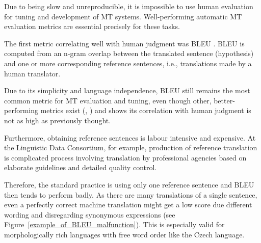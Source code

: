 \documentclass[11pt]{article}
\def\Fref#1{Figure~\ref{#1}}
\begin{document}
Due to being slow and unreproducible, it is impossible to use human evaluation
for tuning and development of MT systems. Well-performing automatic MT 
evaluation metrics are essential precisely for these tasks.



The first metric correlating well with human judgment was BLEU \cite{bleu}.
BLEU is computed from an n-gram overlap between the translated sentence 
(hypothesis) and one or more corresponding reference sentences, i.e., 
translations made by a human translator.

Due to its simplicity and language independence, BLEU still remains the most 
common metric for MT evaluation and tuning, even though other, 
better-performing metrics exist (\cite{wmt13-metrics}, \cite{wmt14}) and 
\cite{callison2006re} shows its correlation with human judgment is not as high 
as previously thought.


Furthermore, obtaining reference sentences is labour intensive and expensive.
At the Linguistic Data Consortium, for example, production of reference 
translation is complicated process involving translation by professional 
agencies based on elaborate guidelines and detailed quality control. 
\cite{strassel} 


Therefore, the standard practice is using only one reference sentence and BLEU 
then tends to perform badly. As there are many translations of a single 
sentence, even a perfectly correct machine translation might get a low score 
due different wording and disregarding synonymous expressions (see 
\Fref{example_of_BLEU_malfunction}). This is especially valid for morphologically 
rich languages with free word order like the Czech language. 
\cite{bojar-tackling-sparse-data}
\end{document}

